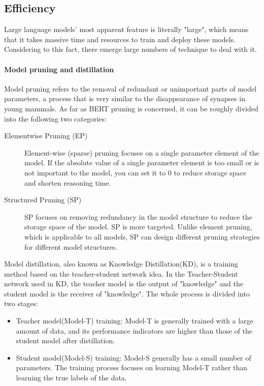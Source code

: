 \documentclass[fleqn,10pt]{SelfArx} %
\begin{document}
\subsection{Efficiency}
Large language models' most apparent feature is literally "large", which means that it takes massive time and resources to train and deploy these models. Considering to this fact, there emerge large numbers of technique to deal with it.
\paragraph{Model pruning and distillation} Model pruning refers to the removal of redundant or unimportant parts of model parameters, a process that is very similar to the disappearance of synapses in young mammals. As far as BERT pruning is concerned, it can be roughly divided into the following two categories:
\begin{description}
	\item[Elementwise Pruning (EP)] Element-wise (sparse) pruning focuses on a single parameter element of the model. If the absolute value of a single parameter element is too small or is not important to the model, you can set it to 0 to reduce storage space and shorten reasoning time.
	\item[Structured Pruning (SP)] SP focuses on removing redundancy in the model structure to reduce the storage space of the model. SP is more targeted. Unlike element pruning, which is applicable to all models, SP can design different pruning strategies for different model structures.
\end{description}

Model distillation, also known as Knowledge Distillation(KD)\cite{hinton2015distillingknowledgeneuralnetwork}, is a training method based on the teacher-student network idea. In the Teacher-Student network used in KD, the teacher model is the output of "knowledge" and the student model is the receiver of "knowledge". The whole process is divided into two stages:
\begin{itemize}
	\item Teacher model(Model-T) training: Model-T is generally trained with a large amount of data, and its performance indicators are higher than those of the student model after distillation.
	\item Student model(Model-S) training: Model-S generally has a small number of parameters. The training process focuses on learning Model-T rather than learning the true labels of the data.
\end{itemize}
\end{document}
